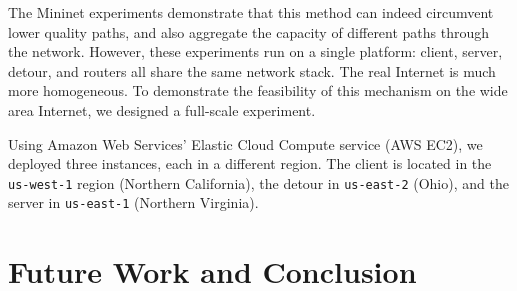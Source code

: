 \documentclass{cwru}
\begin{document}
The Mininet experiments demonstrate that this method can indeed circumvent lower
quality paths, and also aggregate the capacity of different paths through the
network. However, these experiments run on a single platform: client, server,
detour, and routers all share the same network stack. The real Internet is much
more homogeneous. To demonstrate the feasibility of this mechanism on the wide
area Internet, we designed a full-scale experiment.

Using Amazon Web Services' Elastic Cloud Compute service (AWS EC2), we deployed
three instances, each in a different region. The client is located in the
\texttt{us-west-1} region (Northern California), the detour in
\texttt{us-east-2} (Ohio), and the server in \texttt{us-east-1} (Northern
Virginia).

\chapter{Future Work and Conclusion}
\label{c:fwconclude}

\backmatter
\appendix



\end{document}
